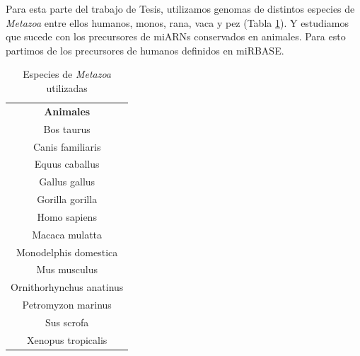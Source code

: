 Para esta parte del trabajo de Tesis, utilizamos genomas de distintos especies de \textit{Metazoa} entre ellos humanos, monos, rana, vaca y pez (Tabla \ref{table:db_metazoa}).
Y estudiamos que sucede con los precursores de miARNs conservados en animales.
Para esto partimos de los precursores de humanos definidos en miRBASE.

\begin{table}[!htbp]
\centering
\small
\caption{Especies de \textit{Metazoa} utilizadas}
\label{table:db_metazoa}
\begin{tabular}{c}
\rowcolor[HTML]{ECF4FF} 
\textbf{Animales}        \\
	Bos taurus               \\
	Canis familiaris         \\
	Equus caballus           \\
	Gallus gallus            \\
	Gorilla gorilla          \\
	Homo sapiens             \\
	Macaca mulatta           \\
	Monodelphis domestica    \\
	Mus musculus             \\
	Ornithorhynchus anatinus \\
	Petromyzon marinus       \\
	Sus scrofa               \\
	Xenopus tropicalis      
\end{tabular}
\end{table}
